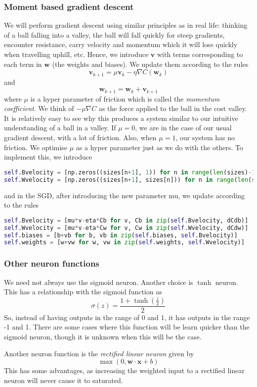 \documentclass[10pt]{article}
\begin{document}
\subsubsection{Moment based gradient descent}
We will perform gradient descent using similar principles as in real life: thinking of a ball falling into a valley, the ball will fall quickly for steep gradients, encounter resistance, carry velocity and momentum which it will lose quickly when travelling uphill, etc. Hence, we introduce $\textbf{v}$ with terms corresponding to each term in $\textbf{w}$ (the weights and biases). We update them according to the rules
\[
\mathbf{v}_{k+1} = \mu \mathbf{v}_k - \eta \nabla C(\mathbf{w}_k) 
\]
and
\[
\mathbf{w}_{k+1} = \mathbf{w}_k + \mathbf{v}_{k+1}
\]
where $\mu$ is a hyper parameter of friction which is called the \textit{momentum coefficient}. We think of $-\mu \nabla C$ as the force applied to the ball in the cost valley. It is relatively easy to see why this produces a system similar to our intuitive understanding of a ball in a valley. If $\mu = 0$, we are in the case of our usual gradient descent, with a lot of friction. Also, when $\mu = 1$, our system has no friction. We optimise $\mu$ as a hyper parameter just as we do with the others. To implement this, we introduce
\begin{lstlisting}[language=Python, breaklines, basicstyle=\small]
self.Bvelocity = [np.zeros((sizes[n+1], 1)) for n in range(len(sizes)-1)]
self.Wvelocity = [np.zeros((sizes[n+1], sizes[n])) for n in range(len(sizes)-1)]
\end{lstlisting}
and in the SGD, after introducing the new parameter mu, we update according to the rules
\begin{lstlisting}[language=Python, breaklines, basicstyle=\small]
self.Bvelocity = [mu*v-eta*Cb for v, Cb in zip(self.Bvelocity, dCdb)]
self.Wvelocity = [mu*v-eta*Cw for v, Cw in zip(self.Wvelocity, dCdw)]
self.biases = [b+vb for b, vb in zip(self.biases, self.Bvelocity)]
self.weights = [w+vw for w, vw in zip(self.weights, self.Wvelocity)]
\end{lstlisting}


\subsubsection{Other neuron functions}
We need not always use the sigmoid neuron. Another choice is $\tanh$ neuron. This has a relationship with the sigmoid function as
\[
\sigma(z)=\frac{1+\tanh(\frac{z}{2})}{2}
\]
So, instead of having outputs in the range of 0 and 1, it has outputs in the range -1 and 1. There are some cases where this function will be learn quicker than the sigmoid neuron, though it is unknown when this will be the case. \par
Another neuron function is the \textit{rectified linear neuron} given by
\[
\max(0,\mathbf{w} \cdot \mathbf{x}+ b)
\]
This has some advantages, as increasing the weighted input to a rectified linear neuron will never cause it to saturated.
\end{document}
